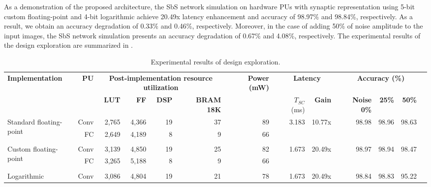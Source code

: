 As a demonstration of the proposed architecture, the SbS network simulation on hardware PUs with synaptic representation using 5-bit custom floating-point and 4-bit logarithmic achieve 20.49x latency enhancement and accuracy of 98.97\% and 98.84\%, respectively. As a result, we obtain an accuracy degradation of 0.33\% and 0.46\%, respectively. Moreover, in the case of adding 50\% of noise amplitude to the input images, the SbS network simulation presents an accuracy degradation of 0.67\% and 4.08\%, respectively. The experimental results of the design exploration are summarized in .

\begin{table}[!t]
	\begin{threeparttable}
		\centering
		\caption{Experimental results of design exploration.}\label{tab:results}
		\scriptsize
		\begin{tabular}{lrrrrrrrrrrrrrrr}\toprule
			\multirow{2}{*}{\textbf{Implementation}} &\multirow{2}{*}{\textbf{PU}} &\multicolumn{4}{c}{\textbf{Post-implementation resource utilization}} & &\multirow{2}{*}{\textbf{Power (mW)}} & &\multicolumn{2}{c}{\textbf{Latency}} & &\multicolumn{3}{c}{\textbf{Accuracy (\%)\tnote{e}}} \\\cmidrule{3-6}\cmidrule{10-11}\cmidrule{13-15}
			& &\textbf{LUT} &\textbf{FF} &\textbf{DSP} &\textbf{BRAM 18K} & & & &$T_{SC}$ (ms) &\textbf{Gain\tnote{d}} & &\textbf{Noise 0\%} &\textbf{25\%} &\textbf{50\%} \\\midrule
			\multirow{2}{*}{Standard floating-point\tnote{a}} &Conv &2,765 &4,366 &19 &37 & &89 & &\multirow{2}{*}{3.183} &\multirow{2}{*}{10.77x} & &\multirow{2}{*}{98.98} &\multirow{2}{*}{98.96} &\multirow{2}{*}{98.63} \\
			&FC &2,649 &4,189 &8 &9 & &66 & & & & & & & \\
			& & & & & & & & & & & & & & \\
			\multirow{2}{*}{Custom floating-point\tnote{b}} &Conv &3,139 &4,850 &19 &25 & &82 & &\multirow{2}{*}{1.673} &\multirow{2}{*}{20.49x} & &\multirow{2}{*}{98.97} &\multirow{2}{*}{98.94} &\multirow{2}{*}{98.47} \\
			&FC &3,265 &5,188 &8 &9 & &66 & & & & & & & \\
			& & & & & & & & & & & & & & \\
			\multirow{2}{*}{Logarithmic\tnote{c}} &Conv &3,086 &4,804 &19 &21 & &78 & &\multirow{2}{*}{1.673} &\multirow{2}{*}{20.49x} & &\multirow{2}{*}{98.84} &\multirow{2}{*}{98.83} &\multirow{2}{*}{95.22} \\

\end{tabular}
\end{threeparttable}
\end{table}
